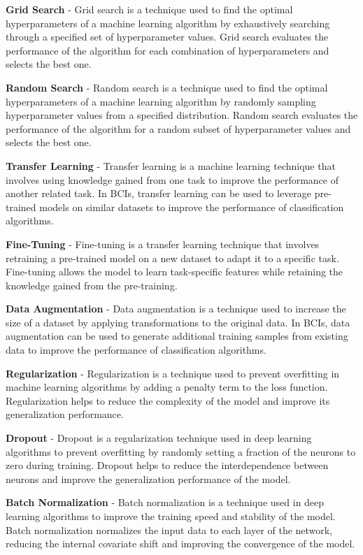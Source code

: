 \textbf{Grid Search} - Grid search is a technique used to find the optimal hyperparameters of a machine learning algorithm by exhaustively searching through a specified set of hyperparameter values. Grid search evaluates the performance of the algorithm for each combination of hyperparameters and selects the best one.

\textbf{Random Search} - Random search is a technique used to find the optimal hyperparameters of a machine learning algorithm by randomly sampling hyperparameter values from a specified distribution. Random search evaluates the performance of the algorithm for a random subset of hyperparameter values and selects the best one.

\textbf{Transfer Learning} - Transfer learning is a machine learning technique that involves using knowledge gained from one task to improve the performance of another related task. In BCIs, transfer learning can be used to leverage pre-trained models on similar datasets to improve the performance of classification algorithms.

\textbf{Fine-Tuning} - Fine-tuning is a transfer learning technique that involves retraining a pre-trained model on a new dataset to adapt it to a specific task. Fine-tuning allows the model to learn task-specific features while retaining the knowledge gained from the pre-training.

\textbf{Data Augmentation} - Data augmentation is a technique used to increase the size of a dataset by applying transformations to the original data. In BCIs, data augmentation can be used to generate additional training samples from existing data to improve the performance of classification algorithms.

\textbf{Regularization} - Regularization is a technique used to prevent overfitting in machine learning algorithms by adding a penalty term to the loss function. Regularization helps to reduce the complexity of the model and improve its generalization performance.

\textbf{Dropout} - Dropout is a regularization technique used in deep learning algorithms to prevent overfitting by randomly setting a fraction of the neurons to zero during training. Dropout helps to reduce the interdependence between neurons and improve the generalization performance of the model.

\textbf{Batch Normalization} - Batch normalization is a technique used in deep learning algorithms to improve the training speed and stability of the model. Batch normalization normalizes the input data to each layer of the network, reducing the internal covariate shift and improving the convergence of the model.


